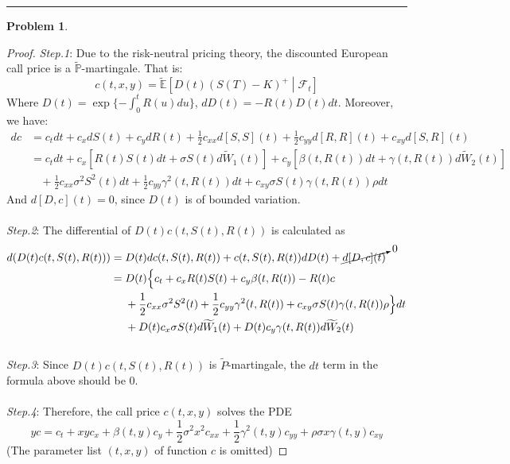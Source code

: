 \documentclass[a4paper, 10pt]{article}
\theoremstyle{definition}
\newtheorem{problem}{Problem}
\theoremstyle{hSol}
\begin{document}
\noindent\rule{16cm}{0.4pt}
\begin{problem} 
\end{problem}
\begin{proof} \textit{Step.1}: Due to the risk-neutral pricing theory, the discounted European call price is a $\widetilde{\mathbb{P}}$-martingale. That is:
\begin{equation}
  c(t,x,y) = \widetilde{\mathbb{E}}\left[D(t)(S(T)-K)^+\middle|\mathcal{F}_t\right]
\end{equation}
Where $D(t)=\exp\{-\int_0^t R(u)du\}$, $dD(t) = -R(t)D(t)dt$. Moreover, we have:
\begin{equation}
  \begin{split}
    dc &= c_t dt + c_x dS(t) + c_y dR(t) + \frac{1}{2}c_{xx}d[S,S](t) + \frac{1}{2}c_{yy}d[R,R](t) + c_{xy}d[S,R](t) \\
    &=c_t dt + c_x\left[R(t)S(t)dt + \sigma S(t)d\widetilde{W}_1(t)\right] + c_y\left[\beta(t,R(t))dt + \gamma(t,R(t)) d\widetilde{W}_2(t)\right] \\
    &~~~~+\frac{1}{2}c_{xx}\sigma^2 S^2(t) dt + \frac{1}{2}c_{yy} \gamma^2(t,R(t)) dt + c_{xy} \sigma S(t)\gamma(t,R(t))\rho dt
  \end{split}
\end{equation}
And $d[D,c](t)=0$, since $D(t)$ is of bounded variation.\\
~\\
\textit{Step.2}: The differential of $D(t)c(t,S(t),R(t))$ is calculated as
\begin{equation}
  \begin{split}
    d(D(t)c(t,S(t),R(t))) &= D(t) dc(t,S(t),R(t)) + c(t,S(t),R(t)) dD(t) + \cancelto{0}{d[D,c](t)} \\
    &=D(t)\Big\{c_t + c_xR(t)S(t) + c_y\beta(t,R(t)) -R(t)c  \\
    &~~~~+\frac{1}{2}c_{xx}\sigma^2 S^2(t) + \frac{1}{2}c_{yy} \gamma^2(t,R(t))  + c_{xy} \sigma S(t)\gamma(t,R(t))\rho \Big\}dt\\
    &~~~~ + D(t)c_x\sigma S(t)d\widetilde{W}_1(t) + D(t)c_y\gamma(t,R(t)) d\widetilde{W}_2(t)
    \end{split}
    \end{equation}
~\\
\textit{Step.3}: Since $D(t)c(t,S(t),R(t))$ is $\widetilde{P}$-martingale, the $dt$ term in the formula above should be 0. \\
~\\
\textit{Step.4}: Therefore, the call price $c(t,x,y)$ solves the PDE
\begin{equation}
  yc = c_t + xy c_x  + \beta(t,y) c_y + \frac{1}{2}\sigma^2 x^2 c_{xx} + \frac{1}{2}\gamma^2(t,y)c_{yy}   + \rho\sigma x \gamma(t,y) c_{xy} 
\end{equation}
(The parameter list $(t,x,y)$ of function $c$ is omitted)
\end{proof}
\end{document}
